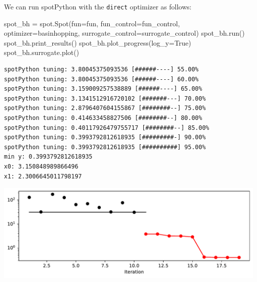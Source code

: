 \documentclass[
  letterpaper,
  DIV=11,
  numbers=noendperiod]{scrreprt}
\newenvironment{Shaded}{\begin{snugshade}}{\end{snugshade}}
\newcommand{\NormalTok}[1]{\textcolor[rgb]{0.00,0.23,0.31}{#1}}
\newcommand{\OperatorTok}[1]{\textcolor[rgb]{0.37,0.37,0.37}{#1}}
\newcommand{\VariableTok}[1]{\textcolor[rgb]{0.07,0.07,0.07}{#1}}
\begin{document}
\begin{tcolorbox}[enhanced jigsaw, rightrule=.15mm, coltitle=black, title=\textcolor{quarto-callout-tip-color}{\faLightbulb}\hspace{0.5em}{Tip: Selecting the Optimizer for the Surrogate}, opacitybacktitle=0.6, bottomrule=.15mm, opacityback=0, left=2mm, colback=white, leftrule=.75mm, colframe=quarto-callout-tip-color-frame, colbacktitle=quarto-callout-tip-color!10!white, toprule=.15mm, toptitle=1mm, bottomtitle=1mm, titlerule=0mm, breakable, arc=.35mm]

We can run spotPython with the \texttt{direct} optimizer as follows:

\begin{Shaded}
\begin{Highlighting}[]
\NormalTok{spot\_bh }\OperatorTok{=}\NormalTok{ spot.Spot(fun}\OperatorTok{=}\NormalTok{fun,}
\NormalTok{                    fun\_control}\OperatorTok{=}\NormalTok{fun\_control,}
\NormalTok{                    optimizer}\OperatorTok{=}\NormalTok{basinhopping,}
\NormalTok{                    surrogate\_control}\OperatorTok{=}\NormalTok{surrogate\_control)}
\NormalTok{spot\_bh.run()}
\NormalTok{spot\_bh.print\_results()}
\NormalTok{spot\_bh.plot\_progress(log\_y}\OperatorTok{=}\VariableTok{True}\NormalTok{)}
\NormalTok{spot\_bh.surrogate.plot()}
\end{Highlighting}
\end{Shaded}

\begin{verbatim}
spotPython tuning: 3.80045375093536 [######----] 55.00% 
spotPython tuning: 3.80045375093536 [######----] 60.00% 
spotPython tuning: 3.159009257538889 [######----] 65.00% 
spotPython tuning: 3.1341512916720102 [#######---] 70.00% 
spotPython tuning: 2.8796407604155867 [########--] 75.00% 
spotPython tuning: 0.414633458827506 [########--] 80.00% 
spotPython tuning: 0.40117926479755717 [########--] 85.00% 
spotPython tuning: 0.3993792812618935 [#########-] 90.00% 
spotPython tuning: 0.3993792812618935 [##########] 95.00% 
min y: 0.3993792812618935
x0: 3.150848989866496
x1: 2.3006645011798197
\end{verbatim}

\includegraphics{004_spot_sklearn_optimization_files/figure-pdf/cell-12-output-2.pdf}


\end{tcolorbox}
\end{document}
